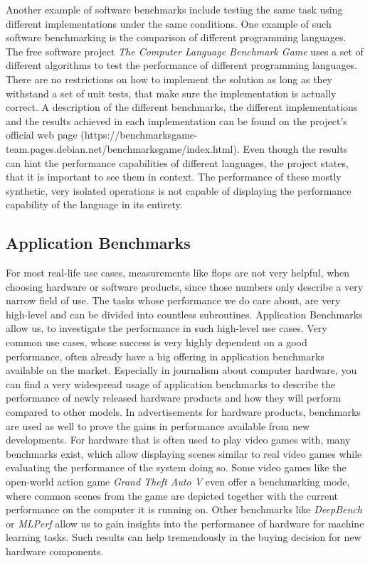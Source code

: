 Another example of software benchmarks include testing the same task using
different implementations under the same conditions.  One example of such
software benchmarking is the comparison of different programming languages. The
free software project \emph{The Computer Language Benchmark Game} uses a set of
different algorithms to test the performance of different programming languages.
There are no restrictions on how to implement the solution as long as they
withstand a set of unit tests, that make sure the implementation is actually
correct. A description of the different benchmarks, the different
implementations and the results achieved in each implementation can be found on
the project's official web page
(https://benchmarksgame-team.pages.debian.net/benchmarksgame/index.html). Even
though the results can hint the performance capabilities of different languages,
the project states, that it is important to see them in context. The performance
of these mostly synthetic, very isolated operations is not capable of
displaying the performance capability of the language in its entirety.
\cite{CompLangBenchmGame}



\subsection{Application Benchmarks}

For most real-life use cases, measurements like \gls{flops} are not very
helpful, when choosing hardware or software products, since those numbers only
describe a very narrow field of use. The tasks whose performance we do
care about, are very high-level and can be divided into countless subroutines.
Application Benchmarks allow us, to investigate the performance in such
high-level use cases. Very common use cases, whose success is very highly
dependent on a good performance, often already have a big offering in application
benchmarks available on the market. Especially in journalism about computer
hardware, you can find a very widespread usage of application benchmarks to
describe the performance of newly released hardware products and how they will
perform compared to other models. In advertisements for hardware products,
benchmarks are used as well to prove the gains in performance available from new
developments. For hardware that is often used to play video games with, many
benchmarks exist, which allow displaying scenes similar to real video games
while evaluating the performance of the system doing so. Some video games like
the open-world action game \emph{Grand Theft Auto V} even offer a benchmarking
mode, where common scenes from the game are depicted together with the current
performance on the computer it is running on. Other benchmarks like
\emph{DeepBench} or \emph{MLPerf} allow us to gain insights into the performance
of hardware for machine learning tasks. Such results can help tremendously in
the buying decision for new hardware components. 
\cite{ApplicationBenchmark, Gta5Bench}


